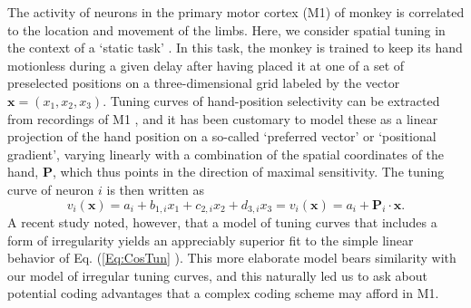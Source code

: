 \documentclass[a4paper]{article}%
\begin{document}
The activity of neurons in the primary motor cortex (M1) of monkey is
correlated to the location and movement of the limbs. Here, we consider
spatial tuning in the context of a `static task'
\cite{Kettner1988PrimateOrigins}. In this task, the monkey is trained to keep
its hand motionless during a given delay after having placed it at one of a
set of preselected positions on a three-dimensional grid labeled by the vector
$\mathbf{x}=\left(  x_{1},x_{2},x_{3}\right)  $. Tuning curves of
hand-position selectivity can be extracted from recordings of M1
\cite{Kettner1988PrimateOrigins,Wang2007MotorReaching}, and it has been
customary to model these as a linear projection of the hand position on a
so-called `preferred vector' or `positional gradient', varying linearly with a
combination of the spatial coordinates of the hand, $\mathbf{P}$, which thus
points in the direction of maximal sensitivity\cite{Wang2007MotorReaching}.
The tuning curve of neuron $i$ is then written as
\begin{equation}
v_{i}(\mathbf{x})=a_{i}+b_{1,i}x_{1}+c_{2,i}x_{2}+d_{3,i}x_{3}=v_{i}%
(\mathbf{x})=a_{i}+\mathbf{P}_{i}\cdot\mathbf{x}. \label{Eq:CosTun}%
\end{equation}
A recent study \cite{Lalazar2016TuningConnectivity} noted, however, that a
model of tuning curves that includes a form of irregularity yields an
appreciably superior fit to the simple linear behavior of Eq. (\ref{Eq:CosTun}%
). This more elaborate model \cite{Lalazar2016TuningConnectivity} bears
similarity with our model of irregular tuning curves, and this naturally led
us to ask about potential coding advantages that a complex coding scheme may
afford in M1.
\end{document}

